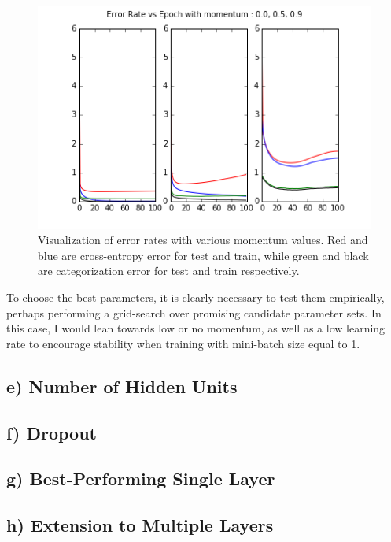 \documentclass{article}
\begin{document}
\begin{figure}[h]
  \centering
  \includegraphics[scale=0.8]{../momentum_tests.png} 
  \caption{Visualization of error rates with various momentum values. Red and blue are cross-entropy error for test and train, while green and black are categorization error for test and train respectively. }
  \label{fig:momentums}
\end{figure}

To choose the best parameters, it is clearly necessary to test them empirically, perhaps performing a grid-search over promising candidate parameter sets. In this case, I would lean towards low or no momentum, as well as a low learning rate to encourage stability when training with mini-batch size equal to 1.

\subsection{e) Number of Hidden Units}


\subsection{f) Dropout}


\subsection{g) Best-Performing Single Layer}


\subsection{h) Extension to Multiple Layers}
\end{document}
